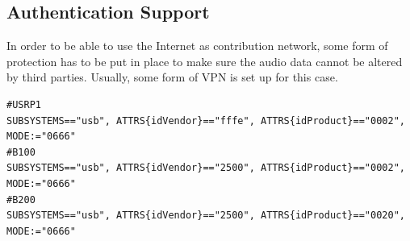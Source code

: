 \subsection{Authentication Support}
In order to be able to use the Internet as contribution network, some form of
protection has to be put in place to make sure the audio data cannot be altered
by third parties. Usually, some form of VPN is set up for this case.

{ \footnotesize
\begin{lstlisting}
#USRP1
SUBSYSTEMS=="usb", ATTRS{idVendor}=="fffe", ATTRS{idProduct}=="0002", MODE:="0666"
#B100
SUBSYSTEMS=="usb", ATTRS{idVendor}=="2500", ATTRS{idProduct}=="0002", MODE:="0666"
#B200
SUBSYSTEMS=="usb", ATTRS{idVendor}=="2500", ATTRS{idProduct}=="0020", MODE:="0666"
\end{lstlisting}
}

